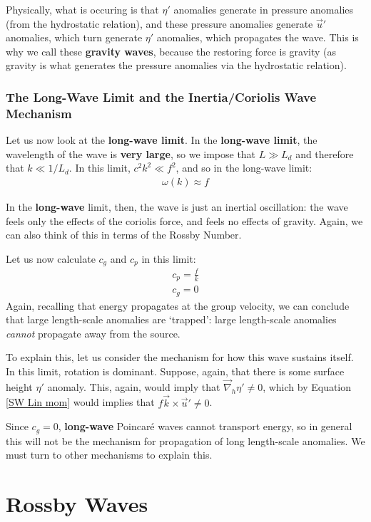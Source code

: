 Physically, what is occuring is that $\eta'$ anomalies generate in pressure anomalies (from the hydrostatic relation), and these pressure anomalies generate $\vec{u}'$ anomalies, which turn generate $\eta'$ anomalies, which propagates the wave. This is why we call these \textbf{gravity waves}, because the restoring force is gravity (as gravity is what generates the pressure anomalies via the hydrostatic relation).

\subsubsection{The Long-Wave Limit and the Inertia/Coriolis Wave Mechanism}

Let us now look at the \textbf{long-wave limit}. In the \textbf{long-wave limit}, the wavelength of the wave is \textbf{very large}, so we impose that $L\gg L_d$ and therefore that $k \ll 1/L_d$. In this limit, $c^2k^2\ll f^2$, and so in the long-wave limit:
\begin{align*}
    \boxed{\omega(k)\approx f}
\end{align*}

In the \textbf{long-wave} limit, then, the wave is just an inertial oscillation: the wave feels only the effects of the coriolis force, and feels no effects of gravity. Again, we can also think of this in terms of the Rossby Number.

Let us now calculate $c_g$ and $c_p$ in this limit:
\begin{align*}
    c_p = \frac{f}{k}\\
    c_g = 0
\end{align*}
Again, recalling that energy propagates at the group velocity, we can conclude that large length-scale anomalies are `trapped': large length-scale anomalies \textit{cannot} propagate away from the source. 

To explain this, let us consider the mechanism for how this wave sustains itself. In this limit, rotation is dominant. Suppose, again, that there is some surface height $\eta'$ anomaly. This, again, would imply that $\vec{\nabla}_h\eta'\neq 0$, which by Equation \ref{SW Lin mom} would implies that $f\vec{k}\times\vec{u}'\neq0$.

Since $c_g=0$, \textbf{long-wave} Poincaré waves cannot transport energy, so in general this will not be the mechanism for propagation of long length-scale anomalies. We must turn to other mechanisms to explain this.

\section{Rossby Waves}

